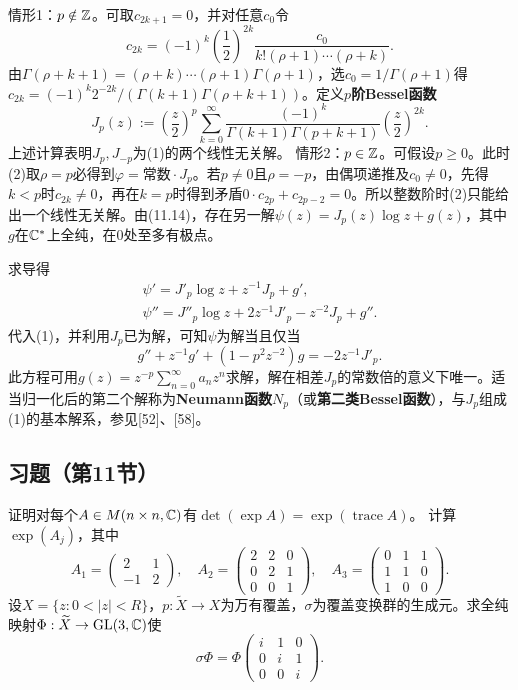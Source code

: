 情形1：$p\notin\mathbb Z$。可取$c_{2k+1}=0$，并对任意$c_0$令
\[
c_{2k}=(-1)^k\left(\frac12\right)^{2k}\frac{c_0}{k!(\rho+1)\cdots(\rho+k)}.
\]
由$\Gamma(\rho+k+1)=(\rho+k)\cdots(\rho+1)\Gamma(\rho+1)$，选$c_0=1/\Gamma(\rho+1)$得$c_{2k}=(-1)^k2^{-2k}/(\Gamma(k+1)\Gamma(\rho+k+1))$。定义\textbf{$p$阶Bessel函数}
\[
J_p(z):=\left(\frac z2\right)^p\sum_{k=0}^\infty
\frac{(-1)^k}{\Gamma(k+1)\Gamma(p+k+1)}\left(\frac z2\right)^{2k}.
\]
上述计算表明$J_p,J_{-p}$为(1)的两个线性无关解。
情形2：$p\in\mathbb Z$。可假设$p\ge0$。此时(2)取$\rho=p$必得到$\varphi=\text{常数}\cdot J_p$。若$p\ne0$且$\rho=-p$，由偶项递推及$c_0\ne0$，先得$k<p$时$c_{2k}\ne0$，再在$k=p$时得到矛盾$0\cdot c_{2p}+c_{2p-2}=0$。所以整数阶时(2)只能给出一个线性无关解。由(11.14)，存在另一解$\psi(z)=J_p(z)\log z+g(z)$，其中$g$在$\mathbb C^*$上全纯，在0处至多有极点。

求导得
\begin{gather*}
\psi'=J'_p\log z+z^{-1}J_p+g',\\
\psi''=J''_p\log z+2z^{-1}J'_p-z^{-2}J_p+g''.
\end{gather*}
代入(1)，并利用$J_p$已为解，可知$\psi$为解当且仅当
\[
g''+z^{-1}g'+(1-p^2z^{-2})g=-2z^{-1}J'_p.
\]
此方程可用$g(z)=z^{-p}\sum_{n=0}^\infty a_nz^n$求解，解在相差$J_p$的常数倍的意义下唯一。适当归一化后的第二个解称为\textbf{Neumann函数}$N_p$（或\textbf{第二类Bessel函数}），与$J_p$组成(1)的基本解系，参见[52]、[58]。
\subsection*{习题（第11节）}
证明对每个$A\in M(n\times n,\mathbb C)$有$\det(\exp A)=\exp(\operatorname{trace}A)$。
计算$\exp(A_j)$，其中
\[
A_1=\begin{pmatrix}2&1\\-1&2\end{pmatrix},\quad
A_2=\begin{pmatrix}2&2&0\\0&2&1\\0&0&1\end{pmatrix},\quad
A_3=\begin{pmatrix}0&1&1\\1&1&0\\1&0&0\end{pmatrix}.
\]
设$X=\{z:0<|z|<R\}$，$p:\widetilde X\to X$为万有覆盖，$\sigma$为覆盖变换群的生成元。求全纯映射$\Phi:\widetilde X\to\operatorname{GL}(3,\mathbb C)$使
\[
\sigma\Phi=\Phi\begin{pmatrix}i&1&0\\0&i&1\\0&0&i\end{pmatrix}.
\]
